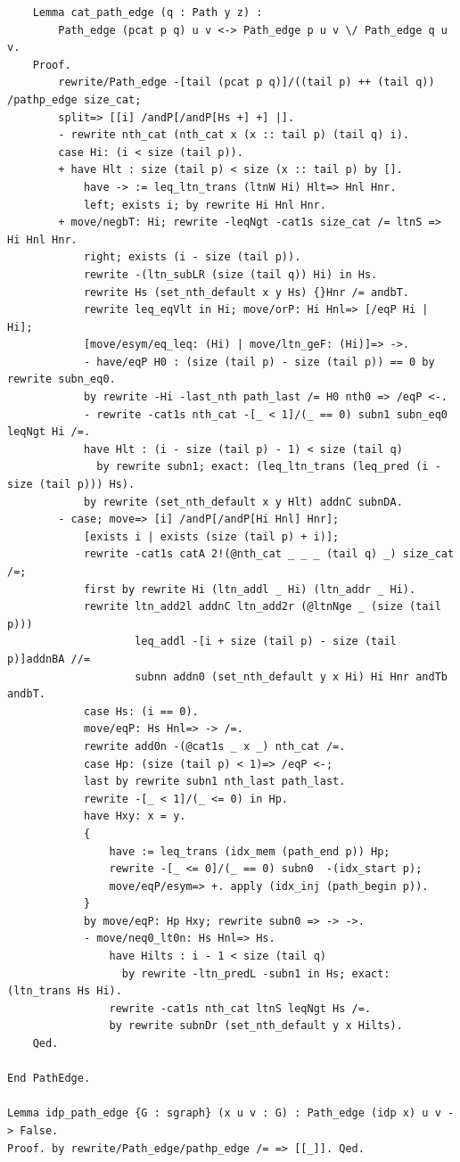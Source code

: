 \begin{verbatim}
    Lemma cat_path_edge (q : Path y z) :
        Path_edge (pcat p q) u v <-> Path_edge p u v \/ Path_edge q u v.
    Proof.
        rewrite/Path_edge -[tail (pcat p q)]/((tail p) ++ (tail q)) /pathp_edge size_cat;
        split=> [[i] /andP[/andP[Hs +] +] |].
        - rewrite nth_cat (nth_cat x (x :: tail p) (tail q) i).
        case Hi: (i < size (tail p)).
        + have Hlt : size (tail p) < size (x :: tail p) by [].
            have -> := leq_ltn_trans (ltnW Hi) Hlt=> Hnl Hnr.
            left; exists i; by rewrite Hi Hnl Hnr.
        + move/negbT: Hi; rewrite -leqNgt -cat1s size_cat /= ltnS => Hi Hnl Hnr.
            right; exists (i - size (tail p)).
            rewrite -(ltn_subLR (size (tail q)) Hi) in Hs.
            rewrite Hs (set_nth_default x y Hs) {}Hnr /= andbT.
            rewrite leq_eqVlt in Hi; move/orP: Hi Hnl=> [/eqP Hi | Hi];
            [move/esym/eq_leq: (Hi) | move/ltn_geF: (Hi)]=> ->.
            - have/eqP H0 : (size (tail p) - size (tail p)) == 0 by rewrite subn_eq0.
            by rewrite -Hi -last_nth path_last /= H0 nth0 => /eqP <-.
            - rewrite -cat1s nth_cat -[_ < 1]/(_ == 0) subn1 subn_eq0 leqNgt Hi /=.
            have Hlt : (i - size (tail p) - 1) < size (tail q) 
              by rewrite subn1; exact: (leq_ltn_trans (leq_pred (i - size (tail p))) Hs).
            by rewrite (set_nth_default x y Hlt) addnC subnDA.
        - case; move=> [i] /andP[/andP[Hi Hnl] Hnr];
            [exists i | exists (size (tail p) + i)]; 
            rewrite -cat1s catA 2!(@nth_cat _ _ _ (tail q) _) size_cat /=;
            first by rewrite Hi (ltn_addl _ Hi) (ltn_addr _ Hi).
            rewrite ltn_add2l addnC ltn_add2r (@ltnNge _ (size (tail p))) 
                    leq_addl -[i + size (tail p) - size (tail p)]addnBA //= 
                    subnn addn0 (set_nth_default y x Hi) Hi Hnr andTb andbT.
            case Hs: (i == 0). 
            move/eqP: Hs Hnl=> -> /=.
            rewrite add0n -(@cat1s _ x _) nth_cat /=.
            case Hp: (size (tail p) < 1)=> /eqP <-; 
            last by rewrite subn1 nth_last path_last.
            rewrite -[_ < 1]/(_ <= 0) in Hp.
            have Hxy: x = y.
            {
                have := leq_trans (idx_mem (path_end p)) Hp;
                rewrite -[_ <= 0]/(_ == 0) subn0  -(idx_start p);
                move/eqP/esym=> +. apply (idx_inj (path_begin p)).
            }
            by move/eqP: Hp Hxy; rewrite subn0 => -> ->.
            - move/neq0_lt0n: Hs Hnl=> Hs.
                have Hilts : i - 1 < size (tail q) 
                  by rewrite -ltn_predL -subn1 in Hs; exact: (ltn_trans Hs Hi).
                rewrite -cat1s nth_cat ltnS leqNgt Hs /=.
                by rewrite subnDr (set_nth_default y x Hilts).
    Qed.

End PathEdge.

Lemma idp_path_edge {G : sgraph} (x u v : G) : Path_edge (idp x) u v -> False.
Proof. by rewrite/Path_edge/pathp_edge /= => [[_]]. Qed.
\end{verbatim}

